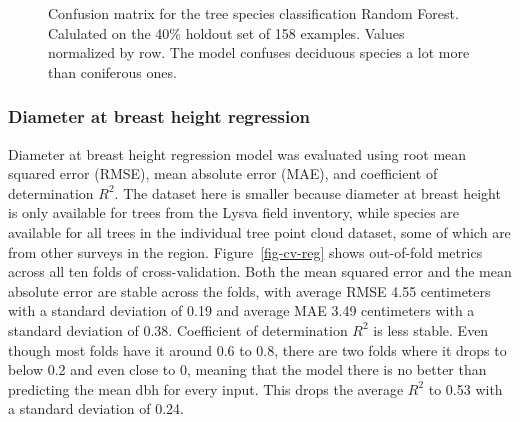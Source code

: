 \begin{figure}
\caption[Confusion matrix for the tree species classification Random Forest.]{\label{fig-clf-confusion-matrix}Confusion matrix for the tree
species classification Random Forest. Calulated on the 40\% holdout set
of 158 examples. Values normalized by row. The model confuses deciduous
species a lot more than coniferous ones.}
\end{figure}

\subsubsection{Diameter at breast height regression}

Diameter at breast height regression model was evaluated using root mean squared error (RMSE), mean absolute error (MAE), and coefficient of determination $R^2$.
The dataset here is smaller because diameter at breast height is only available for trees from the Lysva field inventory, while species are available for all trees in the individual tree point cloud dataset, some of which are from other surveys in the region.
Figure~\ref{fig-cv-reg} shows out-of-fold metrics across all ten folds of cross-validation.
Both the mean squared error and the mean absolute error are stable across the folds, with average RMSE 4.55 centimeters with a standard deviation of 0.19 and average MAE 3.49 centimeters with a standard deviation of 0.38.
Coefficient of determination $R^2$ is less stable.
Even though most folds have it around 0.6 to 0.8, there are two folds where it drops to below 0.2 and even close to 0, meaning that the model there is no better than predicting the mean dbh for every input.
This drops the average $R^2$ to 0.53 with a standard deviation of 0.24.


